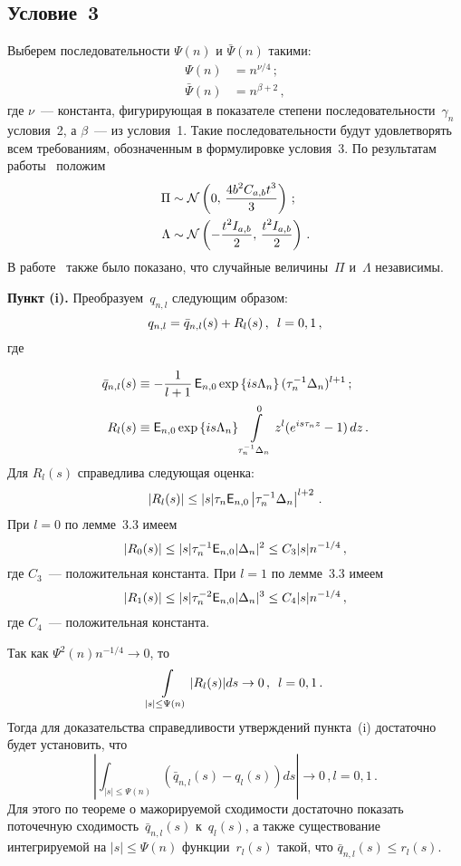 \begin{multicols}{2}
\subsection {Условие~3}

Выберем последовательности $\Psi(n)$ и $\bar{\Psi}(n)$ та\-кими:
\begin{align}
\Psi(n) &= n^{\nu/4}\,; \label{l26}\\
\bar{\Psi}(n) &= n^{\beta+2}\,, \label{l27}
\end{align}
где $\nu$~--- константа, фигурирующая в показателе степени последовательности~$\gamma_n$ условия~2, 
а $\beta$~--- из условия~1. Такие последовательности будут удовлетворять всем требованиям, обозначенным 
в формулировке условия~3. По результатам работы~\cite{article} положим
\begin{align*}
\Pi &\sim {\cal N} \left(0,\, \displaystyle\frac{\displaystyle 4b^2 C_{a,b} t^3\mathstrut}{\displaystyle 3\mathstrut}\right)\,;\\
\Lambda &\sim {\cal N} \left(-\displaystyle\frac{\displaystyle t^2I_{a,b}\mathstrut}{\displaystyle 2\mathstrut},\, \displaystyle\frac{\displaystyle t^2I_{a,b}\mathstrut}{\displaystyle 2\mathstrut}\right)\,.
\end{align*}
В работе~\cite{article} также было показано, что случайные величины~$\Pi$ и~$\Lambda$ независимы.

\medskip

\noindent
\textbf{Пункт (i).} Преобразуем~$q_{n,l}$ следующим образом:
$$
q_{n,l} = \bar{q}_{n,l}(s) + R_l(s)\,, \enskip l = 0, 1\,,
$$
где

\noindent
\begin{align*}
\bar{q}_{n,l}(s) &\equiv -\displaystyle\frac{\displaystyle 1\mathstrut}{\displaystyle l+1\mathstrut}\,{{\sf E}}_{n,0}\exp\left\{is\Lambda_n\right\}(\tau_n^{-1} \Delta_n)^{l+1}\,;
\\
R_l(s) &\equiv {{\sf E}}_{n,0}\exp\left\{is\Lambda_n\right\}\int\limits_{\tau_n^{-1} \Delta_n}^0z^l(e^{is\tau_n z}-1)\,dz\,.
\end{align*}
Для $R_l(s)$ справедлива следующая оценка:
$$
|R_l(s)| \leq |s|\tau_n {{\sf E}}_{n,0}\left |\tau_n^{-1}\Delta_n\right|^{l+2}\,.
$$
При $l=0$ по лемме~3.3 имеем
$$
|R_0(s)| \leq |s|\tau_n^{-1}{{\sf E}}_{n,0}|\Delta_n|^2 \leq C_3 |s| n^{-1/4}\,,
$$
где $C_3$~--- положительная константа. При $l=1$ по лемме~3.3 имеем
$$
|R_1(s)| \leq |s| \tau_n^{-2} {{\sf E}}_{n,0}|\Delta_n|^3 \leq C_4 |s| n^{-1/4}\,,
$$
где $C_4$~--- положительная константа.

Так как $\Psi^2(n) n^{-1/4} \to 0$, то
$$
\int\limits_{|s|\leq\Psi(n)}|R_l(s)|ds \to 0\,,\enskip l=0,1\,.
$$
Тогда для доказательства справедливости утверждений пункта~(i) достаточно будет установить, что
$$
\left|\int_{|s|\leq\Psi(n)}(\bar{q}_{n,l}(s) - q_l(s))ds\right| \to 0\,,  l=0,1\,.
$$
Для этого по теореме о мажорируемой сходимости достаточно показать поточечную 
сходимость~$\bar{q}_{n,l}(s)$ к~$q_l(s)$, а также существование интегрируемой 
на $|s|\leq \Psi(n)$ функции~$r_l(s)$ такой, что $\bar{q}_{n,l}(s)\leq r_l(s)$.


\end{multicols}
